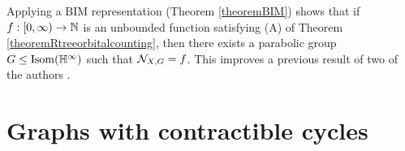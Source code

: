 \begin{remark}
Applying a BIM representation (Theorem \ref{theoremBIM}) shows that if $f:\Rplus\to\N$ is an unbounded function satisfying (A) of Theorem \ref{theoremRtreeorbitalcounting}, then there exists a parabolic group $G\leq\Isom(\H^\infty)$ such that $\mathcal N_{X,G} = f$. This improves a previous result of two of the authors \cite[Proposition A.2]{FSU4}.
\end{remark}




%

\section{Graphs with contractible cycles}
\label{subsectiongraphtheory}

